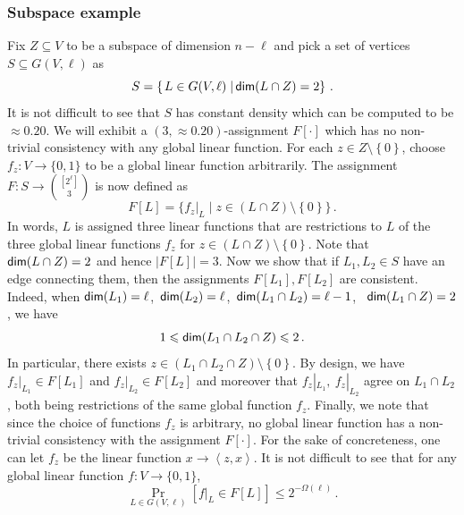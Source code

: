 \documentclass[11pt]{article}
\numberwithin{equation}{section}
\theoremstyle{definition}
\theoremstyle{plain}
\newcommand\sett[2]{\left\{ \left. #1 \;\right\vert #2 \right\}}
\newcommand\set[1]{{\left\{ #1 \right\}}}
\newcommand\Prob[2]{{\Pr_{#1}\left[ {#2} \right]}}
\newcommand*\dimm{{\sf dim}}
\begin{document}
\subsubsection{Subspace example}
Fix $Z\subseteq V$ to be a subspace of dimension $n-\ell$ and pick a set of vertices $S \subseteq G(V,\ell)$ as
\[
S=\sett{L\in G(V,\ell)}{\dimm(L\cap Z) =2}\,.%
\]
It is not difficult to see that $S$ has constant density which can be computed to be $\approx 0.20$.
We will exhibit a $(3, \approx 0.20)$-assignment $F[\cdot]$ which
has no non-trivial consistency with any global linear function.
For each $z \in Z \setminus \set{0}$, choose $f_z: V \to \{0,1\}$ to be a global linear function arbitrarily.
The assignment $F: S \to {[2^\ell] \choose 3}$ is now defined as
%
\[
F[L]=\{ f_z|_L \mid z \in (L\cap Z)\setminus\set{0}\}\,.%
\]
In words, $L$ is assigned three linear functions that are restrictions to $L$ of the three global linear
functions $f_z$ for $z \in  (L\cap Z)\setminus\set{0}$. Note that ${\sf dim}( L \cap Z) =2 $ and hence
$|F[L]|=3$. Now we show that
 if $L_1,L_2\in S$ have an edge connecting them, then the assignments $F[L_1], F[L_2]$ are consistent.
 Indeed, when ${\sf dim}(L_1)=\ell$,~${\sf dim}(L_2) = \ell$,~${\sf dim}(L_1 \cap L_2) = \ell-1$, ~${\sf dim}(L_1 \cap Z)=2$,  we have
 $$  1 \leqslant {\sf dim} (L_1 \cap L_2 \cap Z)  \leqslant 2\,.$$%
 In particular, there exists  $z \in (L_1 \cap L_2 \cap Z) \setminus \set{0}$. By design, we
  have $f_z|_{L_1} \in F[L_1]$
 and $f_z|_{L_2} \in F[L_2]$ and moreover that $f_z|_{L_1}, ~f_z|_{L_2}$ agree on  $L_1 \cap L_2$, both
 being restrictions of the same global function $f_z$. Finally, we note that since the choice of
 functions $f_z$ is arbitrary, no global linear function has a non-trivial consistency with the assignment $F[\cdot]$.
 For the sake of concreteness, one can let $f_z$ be the linear
 function $x \to \left< z, x\right>$. It is not
 difficult to see that for any global linear function $f: V \to \{0,1\}$,
   $$
  \Prob{L \in G(V, \ell)}{f|_L \in F[L] } \leqslant 2^{-\Omega(\ell)}\,.%
   $$
\end{document}
